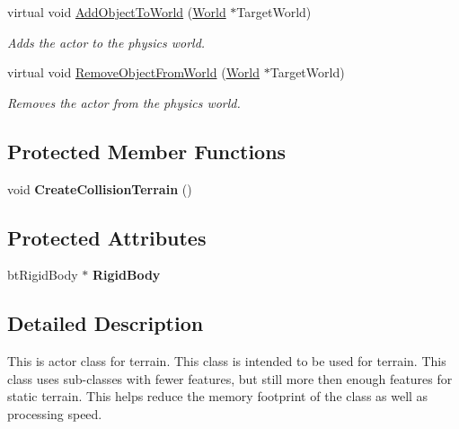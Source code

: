 \begin{DoxyCompactItemize}
virtual void \hyperlink{classphys_1_1ActorTerrain_a890ee6f67fda30381bce9c949ae36566}{AddObjectToWorld} (\hyperlink{classphys_1_1World}{World} $\ast$TargetWorld)
\begin{DoxyCompactList}\small\item\em Adds the actor to the physics world. \item\end{DoxyCompactList}\item 
virtual void \hyperlink{classphys_1_1ActorTerrain_aeded1fdabfc4dd407f81fcc5b97c1f77}{RemoveObjectFromWorld} (\hyperlink{classphys_1_1World}{World} $\ast$TargetWorld)
\begin{DoxyCompactList}\small\item\em Removes the actor from the physics world. \item\end{DoxyCompactList}\end{DoxyCompactItemize}
\subsection*{Protected Member Functions}
\begin{DoxyCompactItemize}
\item 
\hypertarget{classphys_1_1ActorTerrain_ade758919c0f2b58ad1fe4bfd388d79af}{
void {\bfseries CreateCollisionTerrain} ()}
\label{de/d74/classphys_1_1ActorTerrain_ade758919c0f2b58ad1fe4bfd388d79af}

\end{DoxyCompactItemize}
\subsection*{Protected Attributes}
\begin{DoxyCompactItemize}
\item 
\hypertarget{classphys_1_1ActorTerrain_a86b22aad61a7ffceb5c757ddcbca48c3}{
btRigidBody $\ast$ {\bfseries RigidBody}}
\label{de/d74/classphys_1_1ActorTerrain_a86b22aad61a7ffceb5c757ddcbca48c3}

\end{DoxyCompactItemize}


\subsection{Detailed Description}
This is actor class for terrain. This class is intended to be used for terrain. This class uses sub-\/classes with fewer features, but still more then enough features for static terrain. This helps reduce the memory footprint of the class as well as processing speed. 

